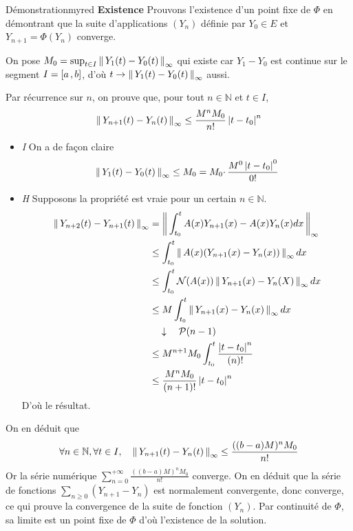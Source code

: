 \begin{omed}{Démonstration}{myred}
        \textbf{Existence} \quad Prouvons l’existence d’un point fixe de $\Phi$ en démontrant que la suite d’applications $(Y_n)$ définie par $Y_0 \in E$ et $Y_{n+1} = \Phi(Y_n)$ converge.
        
        On pose $M_0 = \sup_{t \in I} \left\lVert\,Y_1(t) - Y_0(t)\,\right\rVert_{\infty}$ qui existe car $Y_1 - Y_0$ est continue sur le segment $I = \left[ a \, , b \right]$, d’où $t \to \left\lVert\,Y_1(t) - Y_0(t)\,\right\rVert_{\infty}$ aussi. 
        
        Par récurrence sur $n$, on prouve que, pour tout $n \in \mathbb{N}$ et $t \in I$, 
        \[ \left\lVert\,Y_{n+1}(t) - Y_n(t)\,\right\rVert_{\infty} \leq \frac{M^n M_0}{n!} \left\lvert t-t_0\right\rvert^n \] 
        \begin{itemize}
            \item \textit{I} \quad On a de façon claire 
            \[ \left\lVert\,Y_1(t) - Y_0(t)\,\right\rVert_{\infty} \leq M_0 = M_0 \cdotp \frac{M^0 \left\lvert t - t_0\right\rvert^0}{0!} \]
            \item \textit{H} \quad Supposons la propriété est vraie pour un certain $n \in \mathbb{N}$.
            \begin{align*}
                \left\lVert\,Y_{n+2}(t) - Y_{n+1}(t)\,\right\rVert_{\infty} 
                &= \left\lVert\,\int_{t_0}^{t} A(x)Y_{n+1}(x) - A(x)Y_{n}(x) dx\,\right\rVert_{\infty} \\
                &\leq \int_{t_0}^{t} \left\lVert\,A(x)(Y_{n+1}(x) - Y_{n}(x))\,\right\rVert_{\infty} dx \\
                &\leq \int_{t_0}^{t} \mathcal{N}(A(x)) \left\lVert\,Y_{n+1}(x) - Y_{n}(X)\,\right\rVert_{\infty}dx \\
                &\leq M \int_{t_0}^{t} \left\lVert\,Y_{n+1}(x) - Y_{n}(x)\,\right\rVert_{\infty}dx \\
                & \quad \downarrow \quad \mathcal{P}(n-1) \\
                &\leq M^{n+1} M_0 \int_{t_0}^{t} \frac{\left\lvert t - t_0\right\rvert^{n}}{(n)!} \\
                & \leq \frac{M^n M_0}{(n+1)!} \left\lvert t - t_0\right\rvert^n
            \end{align*}
            D’où le résultat.
        \end{itemize}
        On en déduit que
        \[ \forall n \in \mathbb{N}, \forall t \in I, \quad \left\lVert\,Y_{n+1}(t) - Y_n(t)\,\right\rVert_{\infty} \leq \frac{((b-a)M)^n M_0}{n!} \]   
        Or la série numérique $\sum_{n=0}^{+\infty} \frac{((b-a)M)^n M_0}{n!}$ converge. On en déduit que la série de fonctions $\sum_{n \geq 0} (Y_{n+1} - Y_n)$ est normalement convergente, donc converge, ce qui prouve la convergence de la suite de fonction $(Y_n)$. Par continuité de $\Phi$, sa limite est un point fixe de $\Phi$ d’où l’existence de la solution.


\end{omed}
